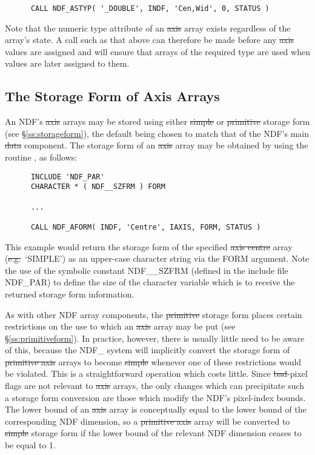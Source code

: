 \small
\begin{verbatim}
      CALL NDF_ASTYP( '_DOUBLE', INDF, 'Cen,Wid', 0, STATUS )
\end{verbatim}
\normalsize

Note that the numeric type attribute of an \st{axis\/} array exists 
regardless of the array's state. 
A call such as that above can therefore be made before any \st{axis\/}
values are assigned and will ensure that arrays of the required type are
used when values are later assigned to them. 

\subsection{The Storage Form of Axis Arrays}

An NDF's \st{axis\/} arrays may be stored using either \st{simple\/} or
\st{primitive\/} storage form (see \S\ref{ss:storageform}), the default
being chosen to match that of the NDF's main \st{data\/} component. 
The storage form of an \st{axis\/} array may be obtained by using the
routine , as follows: 

\small
\begin{verbatim}
      INCLUDE 'NDF_PAR'
      CHARACTER * ( NDF__SZFRM ) FORM

      ...

      CALL NDF_AFORM( INDF, 'Centre', IAXIS, FORM, STATUS )
\end{verbatim}
\normalsize

This example would return the storage form of the specified \st{axis
centre\/} array (\st{e.g.}\ `SIMPLE') as an upper-case character string via
the FORM argument. 
Note the use of the symbolic constant NDF\_\_SZFRM (defined in the include
file NDF\_PAR) to define the size of the character variable which is to
receive the returned storage form information. 

As with other NDF array components, the \st{primitive\/} storage form
places certain restrictions on the use to which an \st{axis\/} array may be
put (see \S\ref{ss:primitiveform}). 
In practice, however, there is usually little need to be aware of this,
because the NDF\_ system will implicitly convert the storage form of
\st{primitive axis\/} arrays to become \st{simple\/} whenever one of
these 
restrictions would be violated.
This is a straightforward operation which costs little. 
Since \st{bad\/}-pixel flags are not relevant to \st{axis\/} arrays, the
only changes which can precipitate such a storage form conversion are those
which modify the NDF's pixel-index bounds. 
The lower bound of an \st{axis\/} array is conceptually equal to the lower
bound of the corresponding NDF dimension, so a \st{primitive axis\/} array
will be converted to \st{simple\/} storage form if the lower bound of the
relevant NDF dimension ceases to be equal to 1. 

